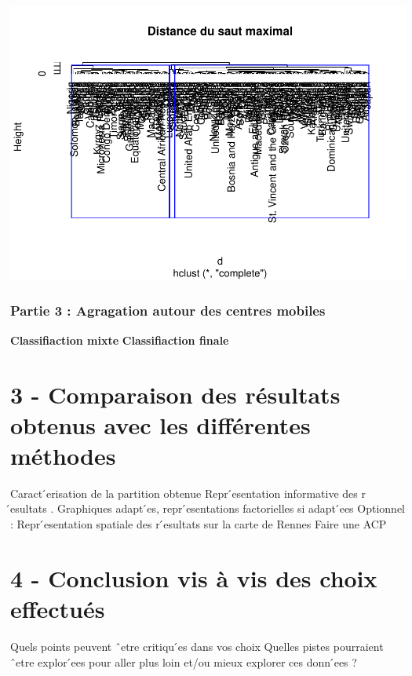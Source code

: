 \documentclass[
]{article}
\begin{document}
\includegraphics{projet_classification_files/figure-latex/unnamed-chunk-23-1.pdf}

\hypertarget{partie-3-agragation-autour-des-centres-mobiles}{%
\subsubsection{Partie 3 : Agragation autour des centres
mobiles}\label{partie-3-agragation-autour-des-centres-mobiles}}

\textbf{Classifiaction mixte} \textbf{Classifiaction finale}

\hypertarget{comparaison-des-ruxe9sultats-obtenus-avec-les-diffuxe9rentes-muxe9thodes}{%
\section{3 - Comparaison des résultats obtenus avec les différentes
méthodes}\label{comparaison-des-ruxe9sultats-obtenus-avec-les-diffuxe9rentes-muxe9thodes}}

Caract ́erisation de la partition obtenue Repr ́esentation informative
des r ́esultats . Graphiques adapt ́es, repr ́esentations factorielles
si adapt ́ees Optionnel : Repr ́esentation spatiale des r ́esultats sur
la carte de Rennes Faire une ACP

\hypertarget{conclusion-vis-uxe0-vis-des-choix-effectuuxe9s}{%
\section{4 - Conclusion vis à vis des choix
effectués}\label{conclusion-vis-uxe0-vis-des-choix-effectuuxe9s}}

Quels points peuvent ˆetre critiqu ́es dans vos choix Quelles pistes
pourraient ˆetre explor ́ees pour aller plus loin et/ou mieux explorer
ces donn ́ees ?
\end{document}
